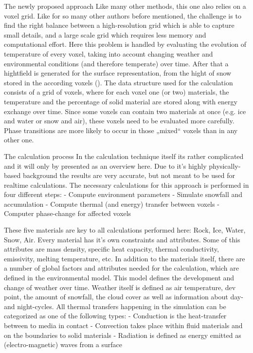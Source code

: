 The newly proposed approach
Like many other methods, this one also relies on a voxel grid. Like for so many other authors before mentioned, the challenge is to find the right balance between a high-resolution grid which is able to capture small details, and a large scale grid which requires less memory and computational effort.
Here this problem is handled by evaluating the evolution of temperature of every voxel, taking into account changing weather and environmental conditions (and therefore temperate) over time. After that a hightfield is generated for the surface representation, from the hight of snow stored in the according voxels ().
The data structure used for the calculation consists of a grid of voxels, where for each voxel one (or two) materials, the temperature and the percentage of solid material are stored along with energy exchange over time. Since some voxels can contain two materials at once (e.g. ice and water or snow and air), these voxels need to be evaluated more carefully. Phase transitions are more likely to occur in those „mixed“ voxels than in any other one.

The calculation process
In the calculation technique itself its rather complicated and it will only by presented as an overview here. Due to it’s highly physically-based background the results are very accurate, but not meant to be used for realtime calculations.
The necessary calculations for this approach is performed in four different steps:
- Compute environment parameters
- Simulate snowfall and accumulation
- Compute thermal (and energy) transfer between voxels
- Computer phase-change for affected voxels

These five materials are key to all calculations performed here: Rock, Ice, Water, Snow, Air. Every material has it’s own constraints and attributes. Some of this attributes are mass density, specific heat capacity, thermal conductivity, emissivity, melting temperature, etc.
In addition to the materials itself, there are a number of global factors and attributes needed for the calculation, which are defined in the environmental model. This model defines the development and change of weather over time. Weather itself is defined as air temperature, dev point, the amount of snowfall, the cloud cover as well as information about day- and night-cycles.
All thermal transfers happening in the simulation can be categorized as one of the following types:
- Conduction is the heat-transfer between to media in contact
- Convection takes place within fluid materials and on the boundaries to solid materials
- Radiation is defined as energy emitted as (electro-magnetic) waves from a surface

